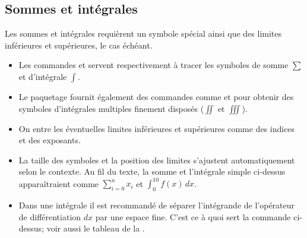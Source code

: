 \subsection{Sommes et intégrales}
\label{sec:math:bases:sommes-et-integrales}

Les sommes et intégrales requièrent un symbole spécial ainsi que des
limites inférieures et supérieures, le cas échéant.
\begin{itemize}
\item Les commandes \cmd{\sum} et \cmd{\int} servent respectivement à tracer les
  symboles de somme $\sum$ et d'intégrale $\int$.
\item Le paquetage  fournit également des commandes comme
  \cmd{\iint} et \cmd{\iiint} pour obtenir des symboles d'intégrales
  multiples finement disposés ($\iint$ et $\iiint$).
\item On entre les éventuelles limites inférieures et supérieures
  comme des indices et des exposants.
\item La taille des symboles et la position des limites s'ajustent
  automatiquement selon le contexte. Au fil du texte, la somme et
  l'intégrale simple ci-dessus apparaîtraient comme
  $\sum_{i = 0}^n x_i$ et $\int_0^{10} f(x)\, dx$.
\item Dans une intégrale il est recommandé de séparer l'intégrande de
  l'opérateur de différentiation $dx$ par une espace fine. C'est ce à
  quoi sert la commande \cmd{\,} ci-dessus; voir aussi le tableau de
  la .
\end{itemize}

